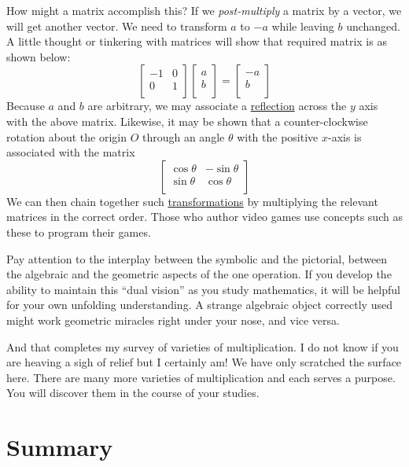 \documentclass[
  a4paper,
]{article}
\begin{document}
How might a matrix accomplish this? If we \emph{post-multiply} a matrix
by a vector, we will get another vector. We need to transform \(a\) to
\(-a\) while leaving \(b\) unchanged. A little thought or tinkering with
matrices will show that required matrix is as shown below: \[
\begin{bmatrix}
-1 & 0\\
0 & 1\\
\end{bmatrix}
\begin{bmatrix}
a\\b\\
\end{bmatrix}
= %
\begin{bmatrix}
-a\\b\\
\end{bmatrix}
\] Because \(a\) and \(b\) are arbitrary, we may associate a
\href{https://planetmath.org/derivationof2dreflectionmatrix}{reflection}
across the \(y\) axis with the above matrix. Likewise, it may be shown
that a counter-clockwise rotation about the origin \(O\) through an
angle \(\theta\) with the positive \(x\)-axis is associated with the
matrix \[
\begin{bmatrix}
\cos\theta & -\sin\theta\\
\sin\theta & \cos\theta\\
\end{bmatrix}
\] We can then chain together such
\href{https://en.wikipedia.org/wiki/Transformation_matrix}{transformations}
by multiplying the relevant matrices in the correct order. Those who
author video games use concepts such as these to program their games.

Pay attention to the interplay between the symbolic and the pictorial,
between the algebraic and the geometric aspects of the one operation. If
you develop the ability to maintain this ``dual vision'' as you study
mathematics, it will be helpful for your own unfolding understanding. A
strange algebraic object correctly used might work geometric miracles
right under your nose, and vice versa.

And that completes my survey of varieties of multiplication. I do not
know if you are heaving a sigh of relief but I certainly am! We have
only scratched the surface here. There are many more varieties of
multiplication and each serves a purpose. You will discover them in the
course of your studies.

\hypertarget{summary}{%
\section{Summary}\label{summary}}
\end{document}
